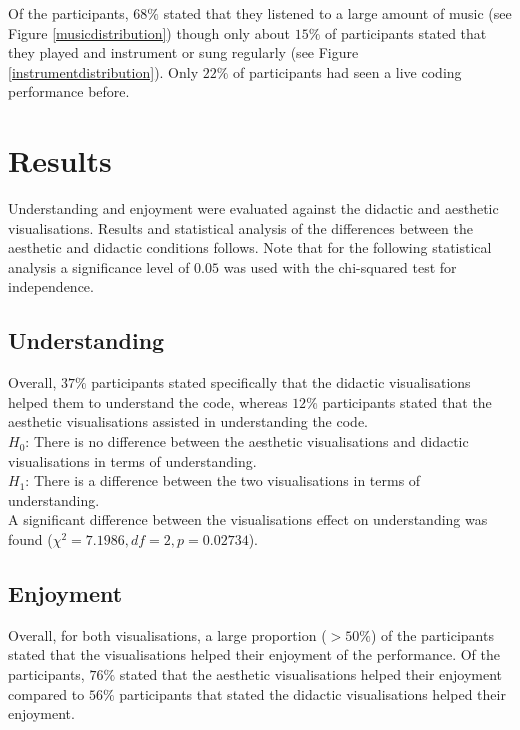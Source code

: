 \documentclass[12pt]{article}
\begin{document}
Of the participants, $68\%$ stated that they listened to a large amount of music (see Figure \ref{musicdistribution}) though only about $15\%$ of participants stated that they played and instrument or sung regularly (see Figure \ref{instrumentdistribution}). Only $22\%$ of participants had seen a live coding performance before.

\section{Results}

Understanding and enjoyment were evaluated against the didactic and aesthetic visualisations. Results and statistical analysis of the differences between the aesthetic and didactic conditions follows. Note that for the following statistical analysis a significance level of $0.05$ was used with the chi-squared test for independence.

\subsection{Understanding}

Overall, $37\%$ participants stated specifically that the didactic visualisations helped them to understand the code, whereas $12\%$ participants stated that the aesthetic visualisations assisted in understanding the code.\\

$H_0$: There is no difference between the aesthetic visualisations and didactic visualisations in terms of understanding.\\
$H_1$: There is a difference between the two visualisations in terms of understanding.\\

A significant difference between the visualisations effect on understanding was found ($\chi^2=7.1986,df=2,p=0.02734$).

\subsection{Enjoyment}
Overall, for both visualisations, a large proportion ($> 50\%$) of the participants stated that the visualisations helped their enjoyment of the performance. Of the participants, $76\%$ stated that the aesthetic visualisations helped their enjoyment compared to $56\%$ participants that stated the didactic visualisations helped their enjoyment.\\
\end{document}
